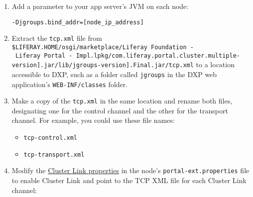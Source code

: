 \begin{enumerate}
\def\labelenumi{\arabic{enumi}.}
\item
  Add a parameter to your app server's JVM on each node:

\begin{verbatim}
-Djgroups.bind_addr=[node_ip_address]
\end{verbatim}
\item
  Extract the \texttt{tcp.xml} file from
  \texttt{\$LIFERAY.HOME/osgi/marketplace/Liferay\ Foundation\ -\ Liferay\ Portal\ -\ Impl.lpkg/com\hspace{0pt}.\hspace{0pt}liferay\hspace{0pt}.\hspace{0pt}portal\hspace{0pt}.\hspace{0pt}cluster\hspace{0pt}.\hspace{0pt}multiple\hspace{0pt}-\hspace{0pt}{[}version{]}.\hspace{0pt}jar/lib\hspace{0pt}/\hspace{0pt}jgroups\hspace{0pt}-\hspace{0pt}{[}version{]}.\hspace{0pt}Final\hspace{0pt}.\hspace{0pt}jar/tcp.xml}
  to a location accessible to DXP, such as a folder called
  \texttt{jgroups} in the DXP web application's \texttt{WEB-INF/classes}
  folder.
\item
  Make a copy of the \texttt{tcp.xml} in the same location and rename
  both files, designating one for the control channel and the other for
  the transport channel. For example, you could use these file names:

  \begin{itemize}
  \item
    \texttt{tcp-control.xml}
  \item
    \texttt{tcp-transport.xml}
  \end{itemize}
\item
  Modify the
  \href{https://docs.liferay.com/portal/7.2-latest/propertiesdoc/portal.properties.html\#Cluster\%20Link}{Cluster
  Link properties} in the node's \texttt{portal-ext.properties} file to
  enable Cluster Link and point to the TCP XML file for each Cluster
  Link channel:


\end{enumerate}
